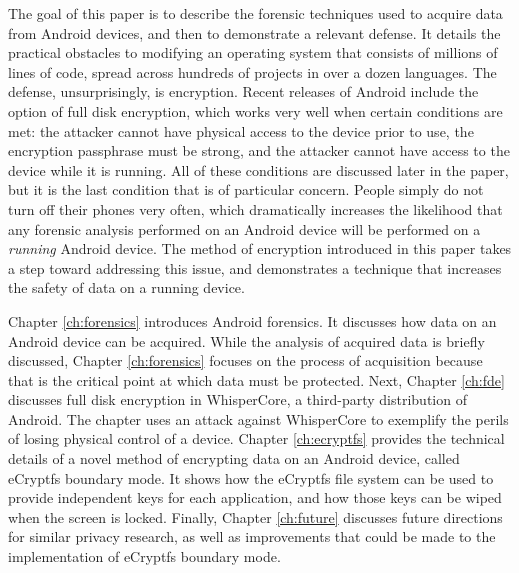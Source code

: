 The goal of this paper is to describe the forensic techniques used to acquire data from Android devices, and
then to demonstrate a relevant defense. It details the practical obstacles to modifying an operating system that consists of
millions of lines of code, spread across hundreds of projects in over a dozen languages.  The defense, unsurprisingly, is
encryption. Recent releases of Android include the option of full disk encryption, which works very well when certain conditions are
met: the attacker cannot have physical access to the device prior to use, the encryption passphrase must be strong, and the attacker
cannot have access to the device while it is running.  All of these conditions are discussed later in the paper, but it
is the last condition that is of particular concern. People simply do not turn off their phones very often, which dramatically
increases the likelihood that any forensic analysis performed on an Android device will be performed on a \emph{running} Android
device. The method of encryption introduced in this paper takes a step toward addressing this issue, and demonstrates a technique
that increases the safety of data on a running device.

Chapter \ref{ch:forensics} introduces Android forensics. It discusses how data on an Android device can be acquired. While the
analysis of acquired data is briefly discussed, Chapter \ref{ch:forensics} focuses on the process of acquisition because that is the
critical point at which data must be protected. Next, Chapter \ref{ch:fde} discusses full disk encryption in WhisperCore, a
third-party distribution of Android. The chapter uses an attack against WhisperCore to exemplify the perils of losing physical
control of a device. Chapter \ref{ch:ecryptfs} provides the technical details of a novel method of encrypting data on an Android
device, called eCryptfs boundary mode. It shows how the eCryptfs file system can be used to provide independent keys for each
application, and how those keys can be wiped when the screen is locked.  Finally, Chapter \ref{ch:future} discusses future
directions for similar privacy research, as well as improvements that could be made to the implementation of eCryptfs boundary mode.
